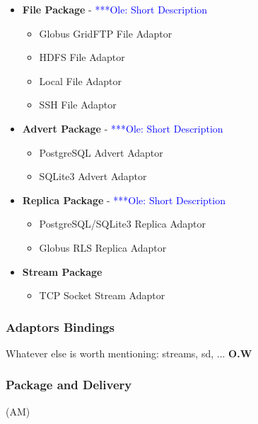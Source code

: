 \documentclass[a4paper,10pt]{article}
\newcommand{\onote}[1]{  {\textcolor{blue}     { ***Ole: #1 }}}
\newcommand{\onote}[1]{}
\begin{document}
 \begin{itemize}

\item \textbf{File Package} - \onote{Short Description}

\begin{itemize}
\item Globus GridFTP File Adaptor
\item HDFS File Adaptor
\item Local File Adaptor
\item SSH File Adaptor

\end{itemize}

\item \textbf{Advert Package} - \onote{Short Description}

\begin{itemize}
\item PostgreSQL Advert Adaptor
\item SQLite3 Advert Adaptor
\end{itemize}

\item \textbf{Replica Package} - \onote{Short Description}

\begin{itemize}
\item PostgreSQL/SQLite3 Replica Adaptor
\item Globus RLS Replica Adaptor
\end{itemize}

\item \textbf{Stream Package}

\begin{itemize}
\item TCP Socket Stream Adaptor
\end{itemize}

\end{itemize}
 


 \subsubsection{Adaptors Bindings}
 Whatever else is worth mentioning: streams, sd, ... \textbf{O.W}


 \subsubsection{Package and Delivery} (AM)
\end{document}
